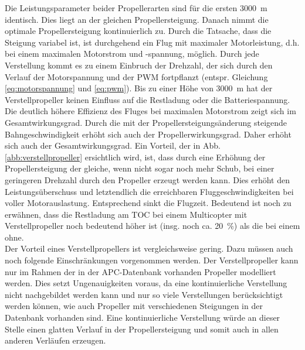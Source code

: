 Die Leistungsparameter beider Propellerarten sind für die ersten \SI{3000}{m} identisch. Dies liegt an der gleichen Propellersteigung. Danach nimmt die optimale Propellersteigung kontinuierlich zu. Durch die Tatsache, dass die Steigung variabel ist, ist durchgehend ein Flug mit maximaler Motorleistung, d.h. bei einem maximalen Motorstrom und -spannung, möglich. Durch jede Verstellung kommt es zu einem Einbruch der Drehzahl, der sich durch den Verlauf der Motorspannung und der PWM fortpflanzt (entspr. Gleichung \ref{eq:motorspannung} und \ref{eq:pwm}). Bis zu einer Höhe von \SI{3000}{m} hat der Verstellpropeller keinen Einfluss auf die Restladung oder die Batteriespannung. Die deutlich höhere Effizienz des Fluges bei maximalen Motorstrom zeigt sich im Gesamtwirkungsgrad. Durch die mit der Propellersteigungsänderung steigende Bahngeschwindigkeit erhöht sich auch der Propellerwirkungsgrad. Daher erhöht sich auch der Gesamtwirkungsgrad. 
Ein Vorteil, der in Abb. \ref{abb:verstellpropeller} ersichtlich wird, ist, dass durch eine Erhöhung der Propellersteigung der gleiche, wenn nicht sogar noch mehr Schub, bei einer geringeren Drehzahl durch den Propeller erzeugt werden kann. Dies erhöht den Leistungsüberschuss und letztendlich die erreichbaren Fluggeschwindigkeiten bei voller Motorauslastung. Entsprechend sinkt die Flugzeit.
Bedeutend ist noch zu erwähnen, dass die Restladung am TOC bei einem Multicopter mit Verstellpropeller noch bedeutend höher ist (insg. noch ca. \SI{20}{\%}) als die bei einem ohne. \\
Der Vorteil eines Verstellpropellers ist vergleichsweise gering. Dazu müssen auch noch folgende Einschränkungen vorgenommen werden. Der Verstellpropeller kann nur im Rahmen der in der APC-Datenbank vorhanden Propeller modelliert werden. Dies setzt Ungenauigkeiten voraus, da eine kontinuierliche Verstellung nicht nachgebildet werden kann und nur so viele Verstellungen berücksichtigt werden können, wie auch Propeller mit verschiedenen Steigungen in der Datenbank vorhanden sind. Eine kontinuierliche Verstellung würde an dieser Stelle einen glatten Verlauf in der Propellersteigung und somit auch in allen anderen Verläufen erzeugen. \\
